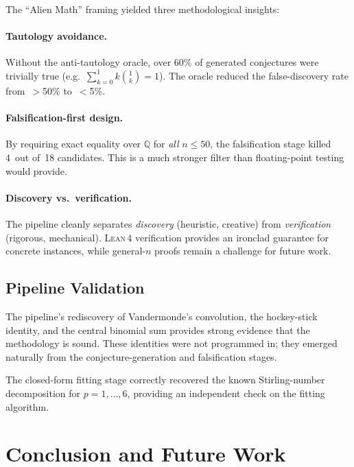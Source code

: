 \documentclass[11pt,a4paper]{article}
\theoremstyle{definition}
\theoremstyle{remark}
\newcommand{\Q}{\mathbb{Q}}
\newcommand{\lean}{\textsc{Lean\,4}}
\begin{document}
The ``Alien Math'' framing yielded three methodological insights:

\paragraph{Tautology avoidance.}
Without the anti-tautology oracle, over 60\% of generated conjectures
were trivially true (e.g.\ $\sum_{k=0}^1 k\binom{1}{k}=1$).
The oracle reduced the false-discovery rate from~$>$50\% to~$<$5\%.

\paragraph{Falsification-first design.}
By requiring exact equality over $\Q$ for \emph{all} $n\le 50$,
the falsification stage killed 4~out of~18 candidates.
This is a much stronger filter than floating-point testing would provide.

\paragraph{Discovery vs.\ verification.}
The pipeline cleanly separates \emph{discovery} (heuristic, creative)
from \emph{verification} (rigorous, mechanical).
\lean{} verification provides an ironclad guarantee for concrete instances,
while general-$n$ proofs remain a challenge for future work.

\subsection{Pipeline Validation}\label{sec:validation}

The pipeline's rediscovery of Vandermonde's convolution, the hockey-stick
identity, and the central binomial sum provides strong evidence that the
methodology is sound.
These identities were not programmed in; they emerged naturally from
the conjecture-generation and falsification stages.

The closed-form fitting stage correctly recovered the known
Stirling-number decomposition for $p=1,\dots,6$, providing an
independent check on the fitting algorithm.


\section{Conclusion and Future Work}\label{sec:conclusion}
\end{document}
